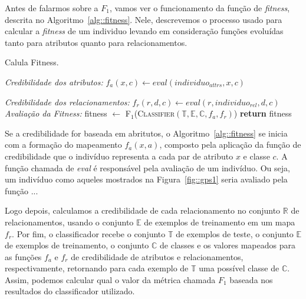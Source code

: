 Antes de falarmos sobre a $F_1$, vamos ver o funcionamento da função de \textit{fitness}, descrita no Algoritmo~\ref{alg::fitness}. 
Nele, descrevemos o processo usado para calcular a \textit{fitness} de um individuo levando em consideração funções evoluídas tanto para atributos quanto para relacionamentos.

\algrenewcommand{}
\algrenewcommand{}
\algrenewcommand{}
\algrenewcommand{}

\begin{algorithm}
\centering
\caption{Calula Fitness.}
\label{alg::fitness}
\begin{algorithmic}[!h]
{
{}
  \State  
  \State \textit{Credibilidade dos atributos:}
      \State $f_a(x,c) \gets eval(individuo_{attrs}, x, c)$
    \EndFor
  \EndFor
  \EndIf
  \State
  
  \State \textit{Credibilidade dos relacionamentos:}
            \State $f_r(r,d,c) \gets eval(r,individuo_{rel}, d, c)$
        \EndFor
    \EndFor
  \EndFor
  \EndIf
  \State
  \State \textit{Avaliação da Fitness:}
  \State fitness $\gets$ \textsc{F$_1$}(\textsc{Classifier}$(\mathbb{T}, \mathbb{E}, \mathbb{C}, f_a, f_r)$)
  \State \textbf{return} fitness
\EndFunction
}
\end{algorithmic}
\end{algorithm}

Se a credibilidade for baseada em abritutos, o Algoritmo~\ref{alg::fitness} se inicia com a formação do mapeamento $f_a(x,a)$, composto pela aplicação da função de credibilidade que o indivíduo representa a cada par de atributo $x$ e classe $c$. A função chamada de \textit{eval} é responsável pela avaliação de um indivíduo. Ou seja, um indivíduo como aqueles mostrados na Figura~\ref{fig::gps1} seria avaliado pela função ...


Logo depois, calculamos a credibilidade de cada relacionamento no conjunto $\mathbb{R}$ de relacionamentos, usando o conjunto $\mathbb{E}$ de exemplos de treinamento em um mapa $f_r$.
Por fim, o classificador recebe o conjunto $\mathbb{T}$ de exemplos de teste, o conjunto $\mathbb{E}$ de exemplos de treinamento, o conjunto $\mathbb{C}$ de classes e os valores mapeados para as funções $f_a$ e $f_r$ de credibilidade de atributos e relacionamentos, respectivamente, retornando para cada exemplo de $\mathbb{T}$ uma possível classe de $\mathbb{C}$.
Assim, podemos calcular qual o valor da métrica chamada \textit{$F_1$} baseada nos resultados do classificador utilizado. 


